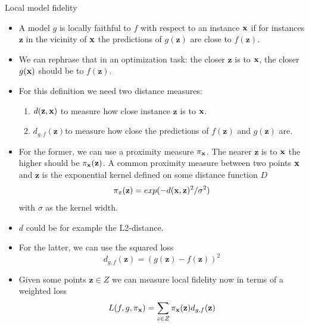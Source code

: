 \documentclass[11pt,compress,t,notes=noshow, xcolor=table]{beamer}
\newcommand{\Gspace}{\mathcal{G}}
\newcommand{\neigh}{\pi_{\xv}}
\newcommand{\zv}{\mathbf{z}}
\begin{document}
 	\begin{vbframe}{Local model fidelity}
 		\begin{itemize}
 			\item A model $g$ is locally faithful to $f$ with respect to an instance $\xv$ if for instances $\zv$ in the vicinity of $\xv$ the predictions of $g(\zv)$ are close to $f(\zv)$. 
 			 \item We can rephrase that in an optimization task: the closer $\zv$ is to $\xv$, the closer $g(\xv)$ should be to $f(\zv)$.  
 			\item For this definition we need two distance measures:
 			\begin{enumerate}
 				\item $d(\zv, \xv)$ to measure how close instance $\zv$ is to $\xv$. \label{first}
 				\item $d_{g, f}(\zv)$to measure how close the predictions of $f(\zv)$ and $g(\zv)$ are. \label{second}
 			\end{enumerate}
 			\item For the former, we can use a proximity measure $\neigh$. The nearer $\zv$ is to $\xv$ the higher should be $\neigh(\zv)$. A common proximity measure between two points $\xv$ and $\zv$ is the exponential kernel defined on some distance function $D$
 			$$\pi_x(\zv) = exp(-d(\xv, \zv)^2/\sigma^2)$$ 
 			with $\sigma$ as the kernel width.  
 			\item $d$ could be for example the L2-distance.
 			\item For the latter, we can use the squared loss $$d_{g,f}(\zv) = (g(\zv) - f(\zv))^2$$  
 			\item Given some points $\zv \in Z$ we can measure local fidelity now in terms of a weighted loss
 			$$L(f, g, \neigh) = \sum_{z \in Z} \neigh(\zv) d_{g,f}(\zv)$$
 		\end{itemize}
\end{vbframe}
\end{document}

